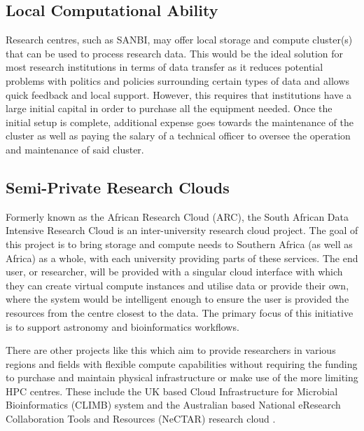 \subsection{Local Computational Ability}

Research centres, such as SANBI, may offer local storage and compute cluster(s) that can be used to process research data. This would be the ideal solution for most research institutions in terms of data transfer as it reduces potential problems with politics and policies surrounding certain types of data and allows quick feedback and local support. However, this requires that institutions have a large initial capital in order to purchase all the equipment needed. Once the initial setup is complete, additional expense goes towards the maintenance of the cluster as well as paying the salary of a technical officer to oversee the operation and maintenance of said cluster.


\subsection{Semi-Private Research Clouds}

Formerly known as the African Research Cloud (ARC), the South African Data Intensive Research Cloud is an inter-university research cloud project. The goal of this project is to bring storage and compute needs to Southern Africa (as well as Africa) as a whole, with each university providing parts of these services. The end user, or researcher, will be provided with a singular cloud interface with which they can create virtual compute instances and utilise data or provide their own, where the system would be intelligent enough to ensure the user is provided the resources from the centre closest to the data. The primary focus of this initiative is to support astronomy and bioinformatics workflows.

There are other projects like this which aim to provide researchers in various regions and fields with flexible compute capabilities without requiring the funding to purchase and maintain physical infrastructure or make use of the more limiting HPC centres. These include the UK based Cloud Infrastructure for Microbial Bioinformatics (CLIMB) system \parencite{connor2016climb} and the Australian based National eResearch Collaboration Tools and Resources (NeCTAR) research cloud \parencite{nectar_cloud}.

